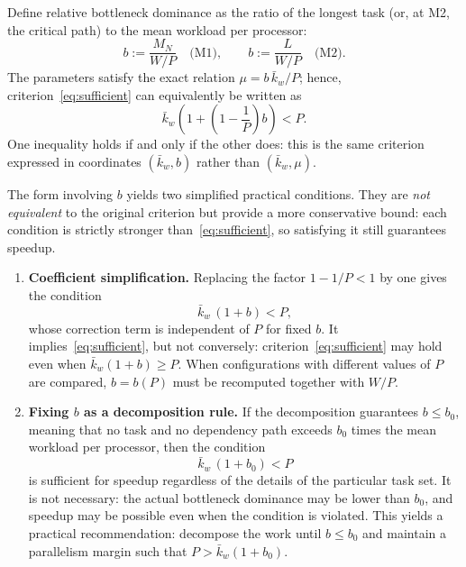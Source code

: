 \begin{remark}\label{rem:dominance}
Define relative bottleneck dominance as the ratio of the longest task (or, at M2, the critical path) to the mean workload per processor:
\[
  b := \frac{M_N}{W/P} \quad \text{(M1)}, \qquad b := \frac{L}{W/P} \quad \text{(M2)}.
\]
The parameters satisfy the exact relation $\mu = b\,\bar{k}_w/P$; hence, criterion~\eqref{eq:sufficient} can equivalently be written as
\[
  \bar{k}_w \left(1 + \left(1 - \frac{1}{P}\right)b\right) < P.
\]
One inequality holds if and only if the other does: this is the same criterion expressed in coordinates $(\bar{k}_w, b)$ rather than $(\bar{k}_w, \mu)$.

The form involving $b$ yields two simplified practical conditions. They are \emph{not equivalent} to the original criterion but provide a more conservative bound: each condition is strictly stronger than~\eqref{eq:sufficient}, so satisfying it still guarantees speedup.
\begin{enumerate}
  \item \textbf{Coefficient simplification.} Replacing the factor $1 - 1/P < 1$ by one gives the condition
  \[
    \bar{k}_w\,(1 + b) < P,
  \]
  whose correction term is independent of $P$ for fixed $b$. It implies~\eqref{eq:sufficient}, but not conversely: criterion~\eqref{eq:sufficient} may hold even when $\bar{k}_w(1+b) \ge P$. When configurations with different values of $P$ are compared, $b=b(P)$ must be recomputed together with $W/P$.
  \item \textbf{Fixing $b$ as a decomposition rule.} If the decomposition guarantees $b \le b_0$, meaning that no task and no dependency path exceeds $b_0$ times the mean workload per processor, then the condition
  \[
    \bar{k}_w\,(1 + b_0) < P
  \]
  is sufficient for speedup regardless of the details of the particular task set. It is not necessary: the actual bottleneck dominance may be lower than $b_0$, and speedup may be possible even when the condition is violated. This yields a practical recommendation: decompose the work until $b \le b_0$ and maintain a parallelism margin such that $P > \bar{k}_w(1 + b_0)$.
\end{enumerate}
\end{remark}
